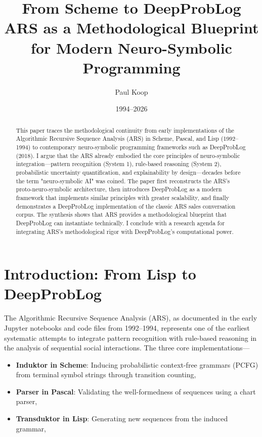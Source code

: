 \documentclass[12pt,a4paper]{article}
\title{\Huge\textbf{From Scheme to DeepProbLog} \\[2mm]
       \LARGE ARS as a Methodological Blueprint \\[2mm]
       \LARGE for Modern Neuro-Symbolic Programming}
\author{
  \large
  \begin{tabular}{c}
    Paul Koop
  \end{tabular}
}
\date{\large 1994--2026}
\begin{document}
\maketitle

\begin{abstract}
This paper traces the methodological continuity from early implementations of 
the Algorithmic Recursive Sequence Analysis (ARS) in Scheme, Pascal, and Lisp 
(1992--1994) to contemporary neuro-symbolic programming frameworks such as 
DeepProbLog (2018). I argue that the ARS already embodied the core principles 
of neuro-symbolic integration—pattern recognition (System 1), rule-based 
reasoning (System 2), probabilistic uncertainty quantification, and explainability 
by design—decades before the term "neuro-symbolic AI" was coined. The paper 
first reconstructs the ARS's proto-neuro-symbolic architecture, then introduces 
DeepProbLog as a modern framework that implements similar principles with 
greater scalability, and finally demonstrates a DeepProbLog implementation of 
the classic ARS sales conversation corpus. The synthesis shows that ARS provides 
a methodological blueprint that DeepProbLog can instantiate technically. I 
conclude with a research agenda for integrating ARS's methodological rigor with 
DeepProbLog's computational power.
\end{abstract}

\newpage
\tableofcontents
\newpage

\section{Introduction: From Lisp to DeepProbLog}

The Algorithmic Recursive Sequence Analysis (ARS), as documented in the early 
Jupyter notebooks and code files from 1992--1994, represents one of the earliest 
systematic attempts to integrate pattern recognition with rule-based reasoning 
in the analysis of sequential social interactions. The three core implementations—

\begin{itemize}
    \item \textbf{Induktor in Scheme}: Inducing probabilistic context-free 
    grammars (PCFG) from terminal symbol strings through transition counting,
    \item \textbf{Parser in Pascal}: Validating the well-formedness of sequences 
    using a chart parser,
    \item \textbf{Transduktor in Lisp}: Generating new sequences from the 
    induced grammar,
\end{itemize}
\end{document}
